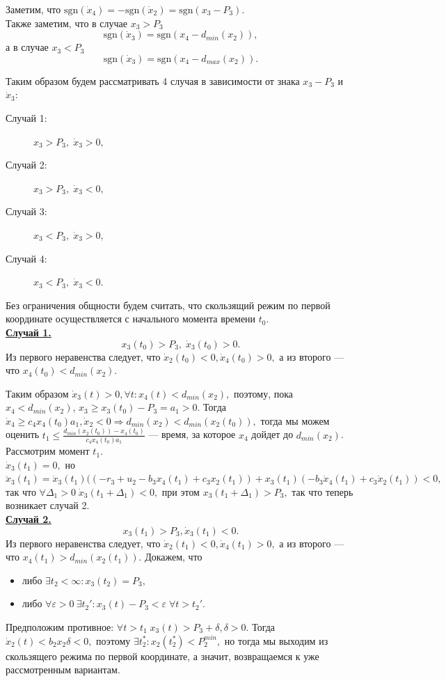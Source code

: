 \documentclass[11pt]{article}
\begin{document}
Заметим, что $\text{sgn}(\dot x_4) = -\text{sgn}(\dot x_2) = \text{sgn}(x_3 - P_3).$ \\
Также заметим, что в случае $x_3 > P_3$ $$\text{sgn}(\dot x_3) =  \text{sgn}(x_4 - d_{min}(x_2)),$$ а в случае $x_3 < P_3$ $$\text{sgn}(\dot x_3) = \text{sgn}(x_4 -d_{max}(x_2)).$$

Таким образом будем рассматривать 4 случая в зависимости от знака $x_3 - P_3$ и $\dot x_3:$


\begin{description}
	\item[Случай 1:] $x_3 > P_3, \; \dot x_3 > 0,$
	\item[Случай 2:] $x_3 > P_3, \; \dot x_3 < 0,$
	\item[Случай 3:] $x_3 < P_3, \; \dot x_3 > 0,$
	\item[Случай 4:] $x_3 < P_3, \; \dot x_3 < 0.$
\end{description}

Без ограничения общности будем считать, что скользящий режим по первой координате осуществляется с начального момента времени $t_0$.\\

\underline {\bf Случай 1.} 
$$x_3(t_0) > P_3, \; \dot x_3(t_0) > 0.$$
Из первого неравенства следует, что $\dot x_2(t_0) < 0, \dot x_4(t_0) > 0,$ а из второго --- что $x_4(t_0) < d_{min}(x_2).$

Таким образом $\dot x_3(t) > 0, \forall t : x_4(t) < d_{min}(x_2),$ поэтому, пока $x_4 < d_{min}(x_2)$, $ x_3 \geqslant x_3(t_0) - P_3 = a_1 > 0.$ Тогда $\dot x_4 \geqslant c_4x_4(t_0)a_1, \dot x_2 < 0 \Rightarrow d_{min}(x_2) < d_{min}(x_2(t_0)),$ тогда мы можем оценить $t_1 \leqslant \frac{d_{min}(x_2(t_0)) - x_4(t_0)}{c_4x_4(t_0)a_1}$ --- время, за которое $x_4$ дойдет до $d_{min}(x_2)$.\\
Рассмотрим момент $t_1.$ \\
$\dot x_3(t_1) = 0,$ но $\ddot x_3(t_1) = \dot x_3(t_1)((-r_3 + u_2 - b_3x_4(t_1) + c_3x_2(t_1)) + x_3(t_1)(-b_3\dot x_4(t_1) + c_3 \dot x_2(t_1)) < 0,$ так что $\forall \Delta_1 > 0 \; \dot x_3(t_1 + \Delta_1) < 0,$ при этом $x_3(t_1 + \Delta_1) > P_3,$ так что теперь возникает случай 2.\\

\underline{\bf Случай 2.}
$$x_3(t_1) > P_3, \dot x_3(t_1) < 0.$$
Из первого неравенства следует, что $\dot x_2(t_1) < 0, \dot x_4(t_1) > 0,$ а из второго --- что $x_4(t_1) > d_{min}(x_2(t_1)).$ Докажем, что 
\begin{itemize}
	\item либо $\exists t_2 < \infty:  x_3(t_2) = P_3,$
	\item либо $\forall \varepsilon > 0 \: \exists t_2' : x_3(t) - P_3 < \varepsilon \; \forall t > t_2'.$
\end{itemize}
Предположим противное: $\forall t > t_1 \; x_3(t) > P_3 + \delta, \delta > 0.$ Тогда $\dot x_2(t) < b_2x_2\delta < 0,$ поэтому $\exists t_2^* : x_2(t_2^*) < P_2^{min},$ но тогда мы выходим из скользящего режима по первой координате, а значит, возвращаемся к уже рассмотренным вариантам.
\end{document}
